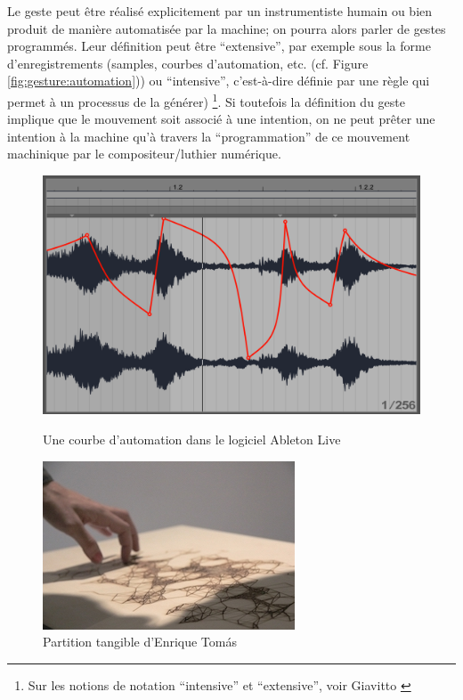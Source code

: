 \noindent Le geste peut être réalisé explicitement par un instrumentiste humain ou bien produit de manière automatisée par la machine; on pourra alors parler de gestes programmés. Leur définition peut être ``extensive'', par exemple sous la forme d'enregistrements (samples, courbes d'automation, etc. (cf. Figure \ref{fig:gesture:automation})) ou ``intensive'', c'est-à-dire définie par une règle qui permet à un processus de la générer) \footnote{Sur les notions de notation ``intensive'' et ``extensive'', voir Giavitto \cite{giavitto_du_2014}}. Si toutefois la définition du geste implique que le mouvement soit associé à une intention, on ne peut prêter une intention à la machine qu'à travers la ``programmation'' de ce mouvement machinique par le compositeur/luthier numérique.
\begin{figure}[!htbp]
	\captionsetup{format=plain}%
	\centering
	\begin{minipage}[t]{0.48\textwidth}
		\includegraphics[width=\linewidth]{gfx/03_gesture/AbletonLiveAutomation_72dpi.png}
		\caption{Une courbe d'automation dans le logiciel Ableton Live}
		\label{fig:gesture:automation}
	\end{minipage}
	\hspace{.02\linewidth}
	\begin{minipage}[t]{0.48\textwidth}
	  \includegraphics[width=\linewidth]{gfx/03_gesture/EnriqueThomas-TangibleScore_72dpi.jpg}
		\caption{Partition tangible d'Enrique Tomás}
		\label{fig:gesture:tangible_score}
	\end{minipage}
\end{figure}
